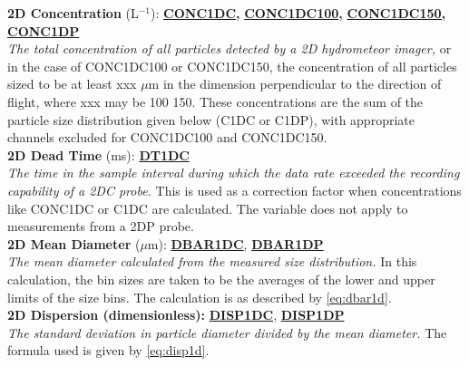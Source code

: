 \begin{hangparagraphs}
\textbf{2D Concentration }(L$^{-1}$):\hypertarget{CONC1DC}{}\hypertarget{CONC1DC100}{}\hypertarget{CONC1DC150}{}\hypertarget{CONC1DP}{}\textbf{
}\textbf{\uline{CONC1DC}}\textbf{,
}\textbf{\uline{CONC1DC100}}\textbf{,
}\textbf{\uline{CONC1DC150,}}\textbf{
}\textbf{\uline{CONC1DP}}\textbf{}\textbf{\uline{}}\\
\emph{The total concentration of all particles
detected by a 2D hydrometeor imager,} or in the case of CONC1DC100
or CONC1DC150, the concentration of all particles sized to be at least
xxx $\mu$m in the dimension perpendicular to the direction of flight,
where xxx may be 100 150. These concentrations are the sum of the
particle size distribution given below (C1DC or C1DP), with appropriate
channels excluded for CONC1DC100 and CONC1DC150.\\

\textbf{2D Dead Time }(ms):\hypertarget{DT1DC}{}\textbf{ }\textbf{\uline{DT1DC}}\\
\emph{The time in the sample interval during which
the data rate exceeded the recording capability of a 2DC probe.} This
is used as a correction factor when concentrations like CONC1DC or
C1DC are calculated. The variable does not apply to measurements from
a 2DP probe.\\

\textbf{2D Mean Diameter }($\mu$m):\hypertarget{DBAR1DC}{}\hypertarget{DBAR1DP}{}\textbf{
}\textbf{\uline{DBAR1DC}},
\textbf{\uline{DBAR1DP}}\\
\emph{The mean diameter calculated
from the measured size distribution. }In this calculation, the bin
sizes are taken to be the averages of the lower and upper limits of
the size bins\emph{. }The calculation is as described by \eqref{eq:dbar1d}.\emph{
}\\

\textbf{2D Dispersion (dimensionless):}\hypertarget{DISP1DC}{}\hypertarget{DISP1DP}{}\textbf{
}\textbf{\uline{DISP1DC}},
\textbf{\uline{DISP1DP}}\\
\emph{The standard deviation in particle diameter
divided by the mean diameter.} The formula used is given by \eqref{eq:disp1d}.\\


\end{hangparagraphs}
